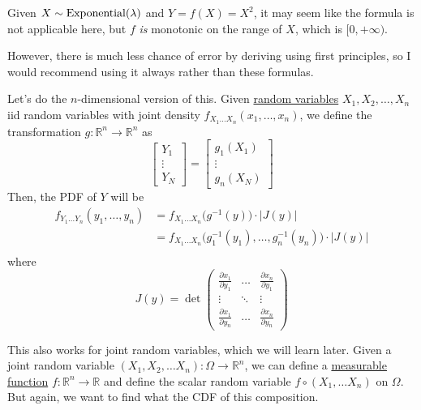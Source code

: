   \begin{example}
    \label{ex:squaring-an-exponential-random-variable}
    Given $X \sim \operatorname{Exponential}(\lambda)$ and $Y = f(X) = X^2$, it may seem like the formula is not applicable here, but $f$ \textit{is} monotonic on the range of $X$, which is $[0, + \infty)$. 
  \end{example}

  However, there is much less chance of error by deriving using first principles, so I would recommend using it always rather than these formulas. 

  Let's do the $n$-dimensional version of this. Given \hyperref[def:random-variable]{random variables} $X_1, X_2, \ldots, X_n$ iid random variables with joint density $f_{X_1 \ldots X_n} (x_1, \ldots, x_n)$, we define the transformation $g: \mathbb{R}^n \rightarrow \mathbb{R}^n$ as 
  \begin{equation}
    \begin{bmatrix} Y_1 \\ \vdots \\ Y_N \end{bmatrix} = \begin{bmatrix} g_1 (X_1) \\ \vdots \\ g_n (X_N) \end{bmatrix}
  \end{equation}
  Then, the PDF of $Y$ will be 
  \begin{align*}
    f_{Y_1 \ldots Y_n} (y_1, \ldots, y_n) & = f_{X_1 \ldots X_n} \big( g^{-1} (y) \big) \cdot | J(y)| \\
    & = f_{X_1 \ldots X_n} \big( g_1^{-1}(y_1), \ldots, g_n^{-1} (y_n) \big) \cdot | J(y)| \\
  \end{align*}
  where 
  \begin{equation}
    J(y) = \det\begin{pmatrix} 
    \frac{\partial x_1}{\partial y_1} & \ldots & \frac{\partial x_n}{\partial y_1} \\
    \vdots & \ddots & \vdots \\ 
    \frac{\partial x_1}{\partial y_n} & \ldots & \frac{\partial x_n}{\partial y_n} \end{pmatrix}
  \end{equation}


  This also works for joint random variables, which we will learn later. Given a joint random variable $(X_1, X_2, \ldots X_n): \Omega \rightarrow \mathbb{R}^n$, we can define a \hyperref[mt-def:measurable-function]{measurable function} $f: \mathbb{R}^n \to \mathbb{R}$ and define the scalar random variable $f \circ (X_1, \ldots X_n)$ on $\Omega$. But again, we want to find what the CDF of this composition. 

